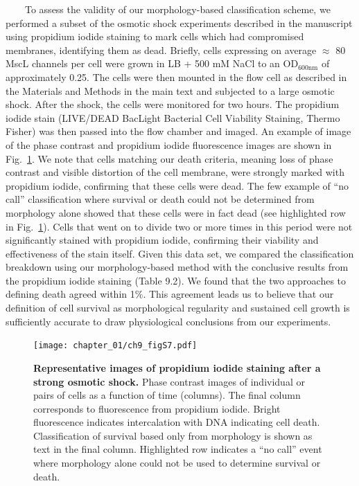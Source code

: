 \documentclass[12pt]{caltech_thesis}
\begin{document}
~~~~To assess the validity of our morphology-based classification
scheme, we performed a subset of the osmotic shock experiments described
in the manuscript using propidium iodide staining to mark cells which
had compromised membranes, identifying them as dead. Briefly, cells
expressing on average \(\approx\) 80 MscL channels per cell were grown
in LB + 500 mM NaCl to an OD\(_{600\text{nm}}\) of approximately 0.25.
The cells were then mounted in the flow cell as described in the
Materials and Methods in the main text and subjected to a large osmotic
shock. After the shock, the cells were monitored for two hours. The
propidium iodide stain (LIVE/DEAD BacLight Bacterial Cell Viability
Staining, Thermo Fisher) was then passed into the flow chamber and
imaged. An example of image of the phase contrast and propidium iodide
fluorescence images are shown in Fig.~\ref{fig:pi_death}. We note that
cells matching our death criteria, meaning loss of phase contrast and
visible distortion of the cell membrane, were strongly marked with
propidium iodide, confirming that these cells were dead. The few example
of ``no call'' classification where survival or death could not be
determined from morphology alone showed that these cells were in fact
dead (see highlighted row in Fig.~\ref{fig:pi_death}). Cells that went
on to divide two or more times in this period were not significantly
stained with propidium iodide, confirming their viability and
effectiveness of the stain itself. Given this data set, we compared the
classification breakdown using our morphology-based method with the
conclusive results from the propidium iodide staining (Table 9.2). We
found that the two approaches to defining death agreed within 1\%. This
agreement leads us to believe that our definition of cell survival as
morphological regularity and sustained cell growth is sufficiently
accurate to draw physiological conclusions from our experiments.

\hypertarget{fig:pi_death}{%
\begin{figure}
\centering
\texttt{[image: chapter\_01/ch9\_figS7.pdf]}
\caption[{Representative images of propidium iodide staining after a
strong osmotic shock.}]{\textbf{Representative images of propidium
iodide staining after a strong osmotic shock.} Phase contrast images of
individual or pairs of cells as a function of time (columns). The final
column corresponds to fluorescence from propidium iodide. Bright
fluorescence indicates intercalation with DNA indicating cell death.
Classification of survival based only from morphology is shown as text
in the final column. Highlighted row indicates a ``no call'' event where
morphology alone could not be used to determine survival or death.}
\label{fig:pi_death}
\end{figure}
}
\end{document}
